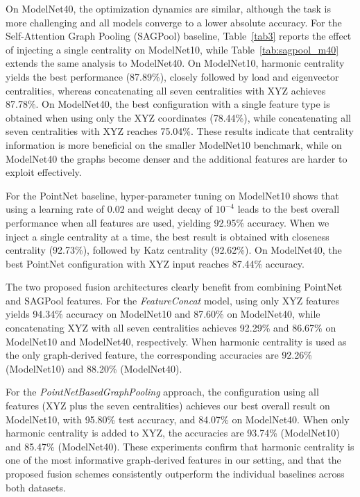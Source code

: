 \documentclass[conference]{IEEEtran}
\begin{document}
On ModelNet40, the optimization dynamics are similar, although the task is
more challenging and all models converge to a lower absolute accuracy. For
the Self-Attention Graph Pooling (SAGPool) baseline, Table~\ref{tab3}
reports the effect of injecting a single centrality on ModelNet10, while
Table~\ref{tab:sagpool_m40} extends the same analysis to ModelNet40. On
ModelNet10, harmonic centrality yields the best performance (87.89\%),
closely followed by load and eigenvector centralities, whereas concatenating
all seven centralities with XYZ achieves 87.78\%. On ModelNet40, the best
configuration with a single feature type is obtained when using only the XYZ
coordinates (78.44\%), while concatenating all seven centralities with XYZ
reaches 75.04\%. These results indicate that centrality information is more
beneficial on the smaller ModelNet10 benchmark, while on ModelNet40 the
graphs become denser and the additional features are harder to exploit
effectively.

For the PointNet baseline, hyper-parameter tuning on ModelNet10 shows that
using a learning rate of $0.02$ and weight decay of $10^{-4}$ leads to the
best overall performance when all features are used, yielding 92.95\%
accuracy. When we inject a single centrality at a time, the best result is
obtained with closeness centrality (92.73\%), followed by Katz centrality
(92.62\%). On ModelNet40, the best PointNet configuration with XYZ input
reaches 87.44\% accuracy.

The two proposed fusion architectures clearly benefit from combining PointNet
and SAGPool features. For the \emph{FeatureConcat} model, using only XYZ
features yields 94.34\% accuracy on ModelNet10 and 87.60\% on ModelNet40,
while concatenating XYZ with all seven centralities achieves 92.29\% and
86.67\% on ModelNet10 and ModelNet40, respectively. When harmonic centrality
is used as the only graph-derived feature, the corresponding accuracies are
92.26\% (ModelNet10) and 88.20\% (ModelNet40).

For the \emph{PointNetBasedGraphPooling} approach, the configuration using
all features (XYZ plus the seven centralities) achieves our best overall
result on ModelNet10, with 95.80\% test accuracy, and 84.07\% on ModelNet40.
When only harmonic centrality is added to XYZ, the accuracies are 93.74\%
(ModelNet10) and 85.47\% (ModelNet40). These experiments confirm that
harmonic centrality is one of the most informative graph-derived features in
our setting, and that the proposed fusion schemes consistently outperform the
individual baselines across both datasets.
\end{document}
